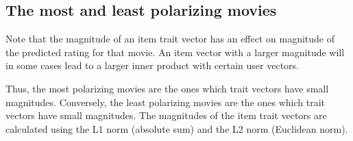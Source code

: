 \documentclass{article}
\begin{document}
\begin{table}[h!]
    \centering
    \caption{Predictions for Toy Story (1995).}
    \label{t3}
\end{table}

\newpage

\subsection{The most and least polarizing movies}
Note that the magnitude of an item trait vector has an effect on magnitude of the predicted rating for that movie. 
An item vector with a larger magnitude will in some cases lead to a larger inner product with certain user vectors.

Thus, the most polarizing movies are the ones which trait vectors have small magnitudes.
Conversely, the least polarizing movies are the ones which trait vectors have small magnitudes.
The magnitudes of the item trait vectors are calculated using the L1 norm (absolute sum) and the L2 norm (Euclidean norm).
\end{document}

